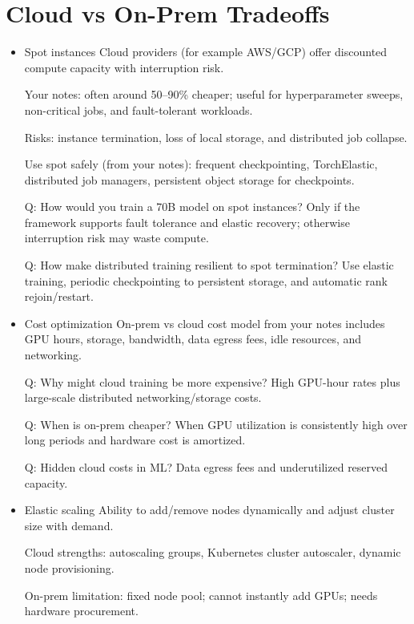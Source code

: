 \documentclass[12pt]{article}
\begin{document}
\section{Cloud vs On-Prem Tradeoffs}

\begin{itemize}
\item Spot instances
Cloud providers (for example AWS/GCP) offer discounted compute capacity with interruption risk.

Your notes: often around 50--90\% cheaper; useful for hyperparameter sweeps, non-critical jobs, and fault-tolerant workloads.

Risks: instance termination, loss of local storage, and distributed job collapse.

Use spot safely (from your notes): frequent checkpointing, TorchElastic, distributed job managers, persistent object storage for checkpoints.

Q: How would you train a 70B model on spot instances?  
Only if the framework supports fault tolerance and elastic recovery; otherwise interruption risk may waste compute.

Q: How make distributed training resilient to spot termination?  
Use elastic training, periodic checkpointing to persistent storage, and automatic rank rejoin/restart.

\item Cost optimization
On-prem vs cloud cost model from your notes includes GPU hours, storage, bandwidth, data egress fees, idle resources, and networking.

Q: Why might cloud training be more expensive?  
High GPU-hour rates plus large-scale distributed networking/storage costs.

Q: When is on-prem cheaper?  
When GPU utilization is consistently high over long periods and hardware cost is amortized.

Q: Hidden cloud costs in ML?  
Data egress fees and underutilized reserved capacity.

\item Elastic scaling
Ability to add/remove nodes dynamically and adjust cluster size with demand.

Cloud strengths: autoscaling groups, Kubernetes cluster autoscaler, dynamic node provisioning.

On-prem limitation: fixed node pool; cannot instantly add GPUs; needs hardware procurement.


\end{itemize}
\end{document}
